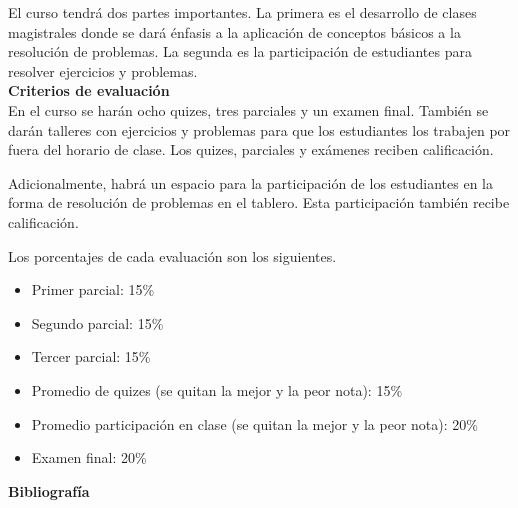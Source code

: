 \documentclass[letterpaper,10pt,onecolumn]{article}
\begin{document}
\noindent\normalsize El curso tendr\'a dos partes importantes. La
primera es el desarrollo de clases magistrales donde se dar\'a
\'enfasis a la aplicaci\'on de conceptos b\'asicos a la resoluci\'on
de problemas. La segunda es la participaci\'on de estudiantes para
resolver ejercicios y problemas. \\[0.1cm]

\noindent\textbf{\large {} \quad Criterios de
  evaluaci\'on}\\[-0.2cm] 

En el curso se har\'an ocho quizes, tres parciales y un examen
final. Tambi\'en se dar\'an talleres con ejercicios y problemas para
que los estudiantes los trabajen por fuera del horario de
clase. Los quizes, parciales y ex\'amenes reciben
calificaci\'on. 

Adicionalmente, habr\'a un espacio para la participaci\'on de
los estudiantes en la forma de resoluci\'on de problemas en el
tablero. Esta participaci\'on tambi\'en recibe calificaci\'on.

Los porcentajes de cada evaluaci\'on son los siguientes.
\begin{itemize}
\item Primer parcial: 15\%
\item Segundo parcial: 15\%
\item Tercer parcial: 15\%
\item Promedio de quizes (se quitan la mejor y la peor nota): 15\%
\item Promedio participaci\'on en clase (se quitan la mejor y la peor
  nota): 20\% 
\item Examen final: 20\%
\end{itemize}






\noindent\textbf{\large {} \quad
  Bibliograf\'ia}\\[-0.2cm] 
\end{document}
